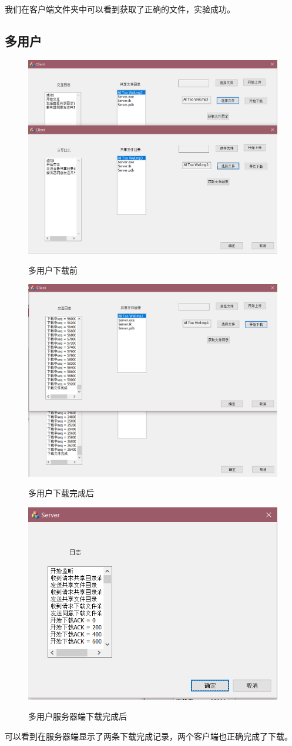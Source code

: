 我们在客户端文件夹中可以看到获取了正确的文件，实验成功。

\subsection{多用户}

\begin{figure}[H]
  \centering
  \includegraphics[width=0.8\linewidth]{figure/multiclient_before_download}\\
  \caption{多用户下载前}
\end{figure}
\begin{figure}[H]
  \centering
  \includegraphics[width=0.8\linewidth]{figure/multiclient_after_download}\\
  \caption{多用户下载完成后}
\end{figure}
\begin{figure}[H]
  \centering
  \includegraphics[width=0.8\linewidth]{figure/multiserver_download}\\
  \caption{多用户服务器端下载完成后}
\end{figure}

可以看到在服务器端显示了两条下载完成记录，两个客户端也正确完成了下载。
\clearpage
